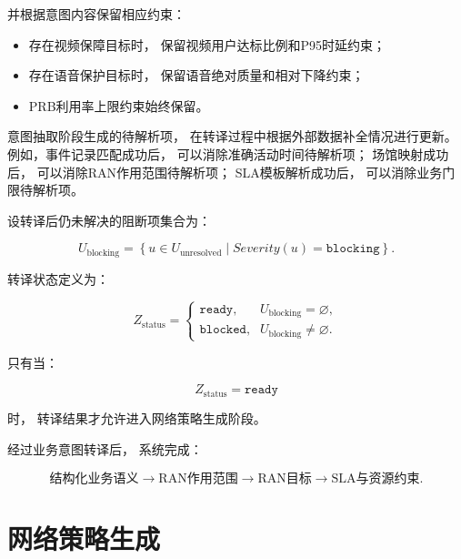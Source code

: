 \documentclass[lang=cn,12pt]{elegantbook}
\begin{document}
并根据意图内容保留相应约束：

\begin{itemize}
    \item 存在视频保障目标时，
    保留视频用户达标比例和P95时延约束；
    \item 存在语音保护目标时，
    保留语音绝对质量和相对下降约束；
    \item PRB利用率上限约束始终保留。
\end{itemize}

意图抽取阶段生成的待解析项，
在转译过程中根据外部数据补全情况进行更新。
例如，事件记录匹配成功后，
可以消除准确活动时间待解析项；
场馆映射成功后，
可以消除RAN作用范围待解析项；
SLA模板解析成功后，
可以消除业务门限待解析项。

设转译后仍未解决的阻断项集合为：

\begin{equation}
U_{\mathrm{blocking}}
=
\left\{
u
\in
U_{\mathrm{unresolved}}
\mid
Severity(u)
=
\texttt{blocking}
\right\}.
\label{eq:translation_blocking_items_reduced}
\end{equation}

转译状态定义为：

\begin{equation}
Z_{\mathrm{status}}
=
\begin{cases}
\texttt{ready},
&
U_{\mathrm{blocking}}
=
\varnothing,
\\[2mm]
\texttt{blocked},
&
U_{\mathrm{blocking}}
\neq
\varnothing.
\end{cases}
\label{eq:translation_status_reduced}
\end{equation}

只有当：

\begin{equation}
Z_{\mathrm{status}}
=
\texttt{ready}
\label{eq:translation_ready_reduced}
\end{equation}

时，
转译结果才允许进入网络策略生成阶段。

经过业务意图转译后，
系统完成：

\begin{equation}
\text{结构化业务语义}
\longrightarrow
\text{RAN作用范围}
\longrightarrow
\text{RAN目标}
\longrightarrow
\text{SLA与资源约束}.
\label{eq:structured_intent_to_ran_requirement}
\end{equation}

\section{网络策略生成}
\label{sec:network_policy_generation}
\end{document}
